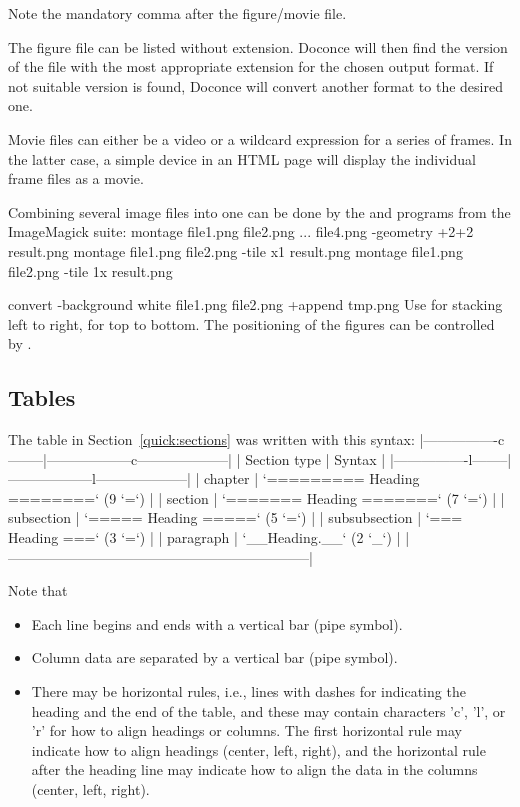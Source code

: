 \documentclass[%
oneside,                 %
final,                   %
chapterprefix=true,      %
open=right               %
10pt]{book}
\begin{document}
{\eccq
Note the mandatory comma after the figure/movie file.

The figure file can be listed without extension. Doconce will then find
the version of the file with the most appropriate extension for the chosen
output format. If not suitable version is found, Doconce will convert
another format to the desired one.

Movie files can either be a video or a wildcard expression for a
series of frames. In the latter case, a simple device in an HTML page
will display the individual frame files as a movie.

Combining several image files into one can be done by the
 and  programs from the ImageMagick suite:
\bsys
montage file1.png file2.png ... file4.png -geometry +2+2  result.png
montage file1.png file2.png -tile x1 result.png
montage file1.png file2.png -tile 1x result.png

convert -background white file1.png file2.png +append tmp.png
\esys
Use  for stacking left to right,  for top to bottom.
The positioning of the figures can be controlled by .

\subsection{Tables}

The table in Section~\ref{quick:sections} was written with this
syntax:
\bccq
|----------------c--------|------------------c--------------------|
|      Section type       |        Syntax                         |
|----------------l--------|------------------l--------------------|
| chapter                 | `========= Heading ========` (9 `=`)  |
| section                 | `======= Heading =======`    (7 `=`)  |
| subsection              | `===== Heading =====`        (5 `=`)  |
| subsubsection           | `=== Heading ===`            (3 `=`)  |
| paragraph               | `__Heading.__`               (2 `_`)  |
|-----------------------------------------------------------------|
\eccq

Note that

\begin{itemize}
 \item Each line begins and ends with a vertical bar (pipe symbol).

 \item Column data are separated by a vertical bar (pipe symbol).

 \item There may be horizontal rules, i.e., lines with dashes for
   indicating the heading and the end of the table, and these may
   contain characters 'c', 'l', or 'r' for how to align headings or
   columns. The first horizontal rule may indicate how to align
   headings (center, left, right), and the horizontal rule after the
   heading line may indicate how to align the data in the columns
   (center, left, right).


\end{itemize}}
\end{document}
